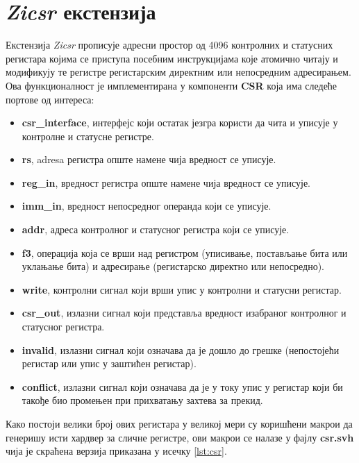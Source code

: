 \section{\textit{Zicsr} екстензија}

Екстензија \textit{Zicsr} прописује адресни простор од 4096 контролних и статусних регистара којима се приступа посебним инструкцијама које атомично читају и модификују те регистре регистарским директним или непосредним адресирањем. Ова функционалност је имплементирана у компоненти \textbf{CSR} која има следеће портове од интереса:
\begin{itemize}
	\item \textbf{csr\_interface}, интерфејс који остатак језгра користи да чита и уписује у контролне и статусне регистре.
	\item \textbf{rs}, adresa регистра опште намене чија вредност се уписује.
	\item \textbf{reg\_in}, вредност регистра опште намене чија вредност се уписује.
	\item \textbf{imm\_in}, вредност непосредног операнда који се уписује.
	\item \textbf{addr}, адреса контролног и статусног регистра који се уписује.
	\item \textbf{f3}, операција која се врши над регистром (уписивање, постављање бита или уклањање бита) и адресирање (регистарско директно или непосредно).
	\item \textbf{write}, контролни сигнал који врши упис у контролни и статусни регистар.
	\item \textbf{csr\_out}, излазни сигнал који представља вредност изабраног контролног и статусног регистра.
	\item \textbf{invalid}, излазни сигнал који означава да је дошло до грешке (непостојећи регистар или упис у заштићен регистар).
	\item \textbf{conflict}, излазни сигнал који означава да је у току упис у регистар који би такође био промењен при прихватању захтева за прекид.
\end{itemize}

Како постоји велики број ових регистара у великој мери су коришћени макрои да генеришу исти хардвер за сличне регистре, ови макрои се налазе у фајлу \textbf{csr.svh} чија је скраћена верзија приказана у исечку \ref{lst:csr}.


